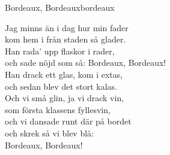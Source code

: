 \begin{song}{Bordeaux, Bordeaux}{bordeaux}
\begin{vers}
Jag minns än i dag hur min fader\\
kom hem i från staden så glader.\\
Han rada' upp flaskor i rader,\\
och sade nöjd som så: Bordeaux, Bordeaux!\\
Han drack ett glas, kom i extas,\\
och sedan blev det stort kalas.\\
Och vi små glin, ja vi drack vin,\\
som första klassens fyllesvin,\\
och vi dansade runt där på bordet\\
och skrek så vi blev blå:\\
Bordeaux, Bordeaux!\\
\end{vers}
\end{song}
